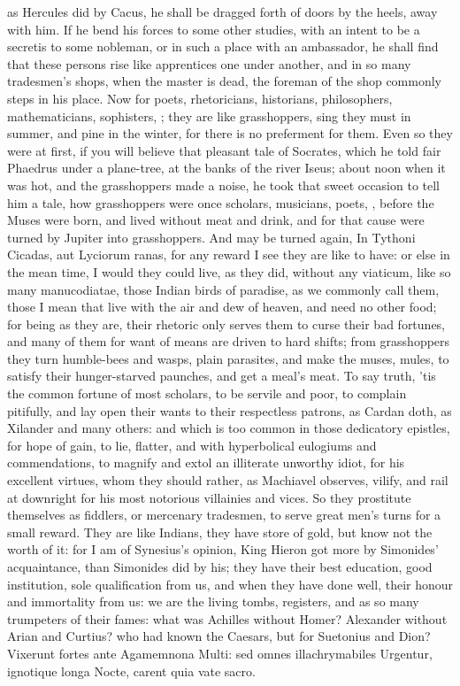 {as Hercules did by Cacus, he shall be dragged forth of doors by the
heels, away with him. If he bend his forces to some other studies, with
an intent to be a secretis to some nobleman, or in such a place with an
ambassador, he shall find that these persons rise like apprentices one
under another, and in so many tradesmen's shops, when the master is
dead, the foreman of the shop commonly steps in his place. Now for
poets, rhetoricians, historians, philosophers, mathematicians,
sophisters, \etc{}; they are like grasshoppers, sing they must in summer,
and pine in the winter, for there is no preferment for them. Even so
they were at first, if you will believe that pleasant tale of Socrates,
which he told fair Phaedrus under a plane-tree, at the banks of the
river Iseus; about noon when it was hot, and the grasshoppers made a
noise, he took that sweet occasion to tell him a tale, how grasshoppers
were once scholars, musicians, poets, \etc{}, before the Muses were born,
and lived without meat and drink, and for that cause were turned by
Jupiter into grasshoppers. And may be turned again, In Tythoni Cicadas,
aut Lyciorum ranas, for any reward I see they are like to have: or else
in the mean time, I would they could live, as they did, without any
viaticum, like so many manucodiatae, those Indian birds of
paradise, as we commonly call them, those I mean that live with the air
and dew of heaven, and need no other food; for being as they are, their
rhetoric only serves them to curse their bad fortunes, and many
of them for want of means are driven to hard shifts; from grasshoppers
they turn humble-bees and wasps, plain parasites, and make the muses,
mules, to satisfy their hunger-starved paunches, and get a meal's meat.
To say truth, 'tis the common fortune of most scholars, to be servile
and poor, to complain pitifully, and lay open their wants to their
respectless patrons, as Cardan doth, as Xilander and many
others: and which is too common in those dedicatory epistles, for hope
of gain, to lie, flatter, and with hyperbolical eulogiums and
commendations, to magnify and extol an illiterate unworthy idiot, for
his excellent virtues, whom they should rather, as Machiavel
observes, vilify, and rail at downright for his most notorious
villainies and vices. So they prostitute themselves as fiddlers, or
mercenary tradesmen, to serve great men's turns for a small reward.
They are like Indians, they have store of gold, but know not the
worth of it: for I am of Synesius's opinion, King Hieron got more
by Simonides' acquaintance, than Simonides did by his; they have their
best education, good institution, sole qualification from us, and when
they have done well, their honour and immortality from us: we are the
living tombs, registers, and as so many trumpeters of their fames: what
was Achilles without Homer? Alexander without Arian and Curtius? who
had known the Caesars, but for Suetonius and Dion?
Vixerunt fortes ante Agamemnona
Multi: sed omnes illachrymabiles
Urgentur, ignotique longa
Nocte, carent quia vate sacro.

}
